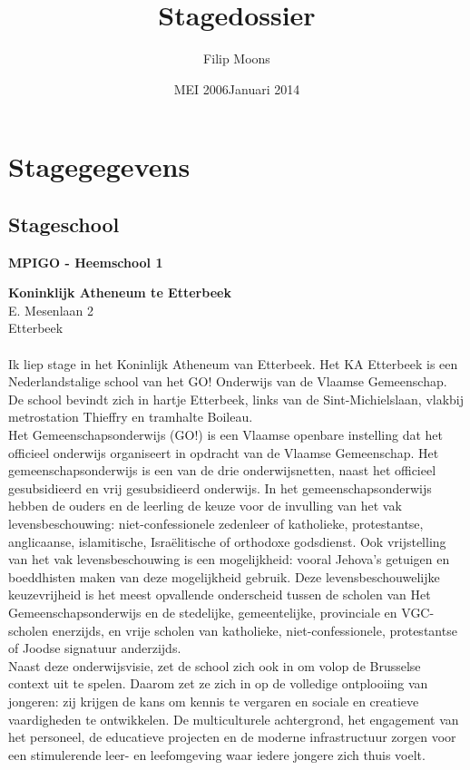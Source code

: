 \documentclass[a4paper,11pt]{article}
\author{Filip Moons}
\title{Stagedossier}
\date{MEI 2006}
\date{Januari 2014}
\theoremstyle{definition}
\begin{document}
\maketitlepage


\tableofcontents
\newpage
\section{Stagegegevens}
\subsection{Stageschool}
\textbf{MPIGO - Heemschool 1}

\textbf{Koninklijk Atheneum te Etterbeek}\\
\noindent 	E. Mesenlaan 2\\
 Etterbeek\\

\\ \noindent Ik liep stage in het Koninlijk Atheneum van Etterbeek. Het KA Etterbeek is een Nederlandstalige school van het GO! Onderwijs van de Vlaamse Gemeenschap. 
De school bevindt zich in hartje Etterbeek, links van de Sint-Michielslaan, vlakbij metrostation Thieffry en tramhalte 
Boileau. \\

\noindent Het Gemeenschapsonderwijs (GO!) is een Vlaamse openbare instelling dat het officieel onderwijs organiseert in opdracht van de Vlaamse Gemeenschap. Het gemeenschapsonderwijs is een van de drie onderwijsnetten, naast het officieel 
gesubsidieerd en vrij gesubsidieerd onderwijs. In het gemeenschapsonderwijs hebben de ouders en de leerling de keuze voor de invulling van het vak levensbeschouwing: niet-confessionele zedenleer of katholieke, protestantse, anglicaanse, islamitische, Israëlitische of orthodoxe godsdienst. Ook vrijstelling van het vak levensbeschouwing is een mogelijkheid: vooral Jehova's getuigen en boeddhisten maken van deze mogelijkheid gebruik. Deze levensbeschouwelijke keuzevrijheid is het meest opvallende onderscheid tussen de scholen van Het Gemeenschapsonderwijs en de stedelijke, gemeentelijke, provinciale en VGC-scholen enerzijds, en vrije scholen van katholieke, niet-confessionele, protestantse of Joodse signatuur 
anderzijds.\\

\noindent Naast deze onderwijsvisie, zet de school zich ook in om volop de Brusselse 
context uit te spelen. Daarom zet ze zich in op de volledige ontplooiing van 
jongeren:  zij krijgen de kans om kennis te vergaren en sociale en creatieve vaardigheden te ontwikkelen. De multiculturele achtergrond, het engagement van het personeel, de educatieve projecten en de moderne infrastructuur zorgen voor een stimulerende leer- en leefomgeving waar iedere jongere zich thuis 
voelt.\\
\end{document}
